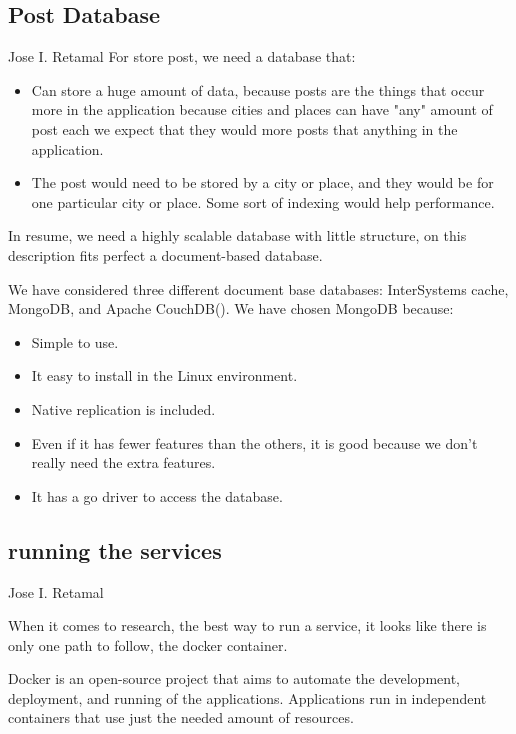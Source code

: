 \subsection{Post Database}
Jose I. Retamal
\vskip 0.1in
\indent
\indent
For store post, we need a database that:
\begin{itemize}
	\item Can store a huge amount of data, because posts are the things that occur more in the application because cities and places can have "any" amount of post each we expect that they would more posts that anything in the application. 
	
	\item The post would need to be stored by a city or place, and they would be for one particular city or place. Some sort of indexing would help performance.


\end{itemize}

	In resume, we need a highly scalable database with little structure, on this description fits perfect a document-based database.

We have considered three different document base databases: InterSystems cache, MongoDB, and Apache CouchDB(). We have  chosen MongoDB because:

\begin{itemize}
	\item Simple to use.
	\item It easy to install in the Linux environment.
	\item Native replication is included.
	\item Even if it has fewer features than the others, it is good because we don't really need the extra features.
	\item It has a go driver to access the database. 
\end{itemize}


\subsection{running the services}
Jose I. Retamal
\vskip 0.1in
\indent
\indent

When it comes to research, the best way to run a service, it looks like there is only one path to follow, the docker container. 

Docker is an open-source project that aims to automate the development, deployment, and running of the applications. Applications run in independent containers that use just the needed amount of resources.

